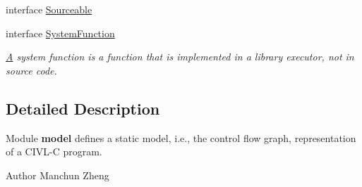 \begin{DoxyCompactItemize}
interface \hyperlink{interfaceedu_1_1udel_1_1cis_1_1vsl_1_1civl_1_1model_1_1IF_1_1Sourceable}{Sourceable}
\item 
interface \hyperlink{interfaceedu_1_1udel_1_1cis_1_1vsl_1_1civl_1_1model_1_1IF_1_1SystemFunction}{System\+Function}
\begin{DoxyCompactList}\small\item\em \hyperlink{structA}{A} system function is a function that is implemented in a library executor, not in source code. \end{DoxyCompactList}\end{DoxyCompactItemize}


\subsection{Detailed Description}
Module {\bfseries model} defines a static model, i.\+e., the control flow graph, representation of a C\+I\+V\+L-\/\+C program. 

\begin{DoxyAuthor}{Author}
Manchun Zheng 
\end{DoxyAuthor}
